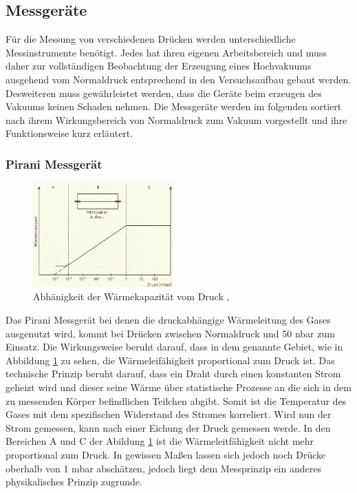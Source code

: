 \subsection{Messgeräte}
Für die Messung von verschiedenen Drücken werden unterschiedliche Messinstrumente benötigt. Jedes hat ihren eigenen Arbeitsbereich und muss daher zur vollständigen Beobachtung der Erzeugung eines Hochvakuums ausgehend vom Normaldruck entsprechend in den Versuchsaufbau gebaut werden. Desweiteren muss gewährleistet werden, dass die Geräte beim erzeugen des Vakuums keinen Schaden nehmen. Die Messgeräte werden im folgenden sortiert nach ihrem Wirkungsbereich von Normaldruck zum Vakuum vorgestellt und ihre Funktionsweise kurz erläutert.

\subsubsection{Pirani Messgerät}
\begin{figure}
  \centering
  \includegraphics[width=0.48\textwidth]{picture/Pirani.JPG}
  \caption{Abhänigkeit der Wärmekapazität vom Druck \cite{Dreh}, \cite{Jena}}
  \label{fig:pirani}
  \vspace{-0.6cm}
\end{figure}
Das Pirani Messgerät bei denen die druckabhängige Wärmeleitung des Gases ausgenutzt wird, kommt bei Drücken zwischen Normaldruck und 50 nbar zum Einsatz. Die Wirkungsweise beruht darauf, dass in dem genannte Gebiet, wie in Abbildung \ref{fig:pirani} zu sehen, die Wärmeleifähigkeit proportional zum Druck ist. Das technische Prinzip beruht darauf, dass ein Draht durch einen konstanten Strom geheizt wird und dieser seine Wärme über statistische Prozesse an die sich in dem zu messenden Körper befindlichen Teilchen abgibt. Somit ist die Temperatur des Gases mit dem spezifischen Widerstand des Stromes korreliert. Wird nun der Strom gemessen, kann nach einer Eichung der Druck gemessen werde. In den Bereichen A und C der Abildung \ref{fig:pirani} ist die Wärmeleitfähigkeit nicht mehr proportional zum Druck. In gewissen Maßen lassen sich jedoch noch Drücke oberhalb von 1 mbar abschätzen, jedoch liegt dem Messprinzip ein anderes physikalisches Prinzip zugrunde.

